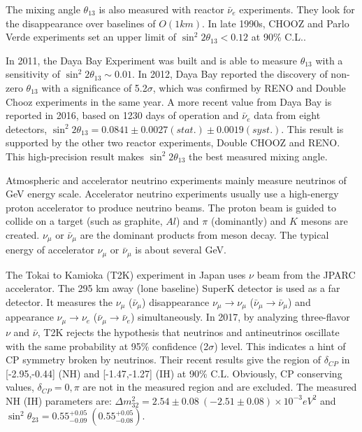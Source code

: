 \documentclass[preprint,12pt]{elsarticle}
\numberwithin{equation}{section}
\begin{document}
The mixing angle $\theta_{13}$ is also measured with reactor $\bar{\nu}_e$ experiments. They look for the disappearance over baselines of $O(1 km)$. In late 1990s, CHOOZ and Parlo Verde experiments set an upper limit of $\sin^2 2\theta_{13}<0.12$ at 90\% C.L.\cite{joseTextbook}.

In 2011, the Daya Bay Experiment was built and is able to measure $\theta_{13}$ with a sensitivity of $\sin^2 2\theta_{13}\sim 0.01$.
In 2012, Daya Bay reported the discovery of non-zero $\theta_{13}$ with a significance of 5.2$\sigma$, which was confirmed by RENO and Double Chooz experiments in the same year. A more recent value from Daya Bay is reported in 2016\cite{dayabayresults}, based on 1230 days of operation and $\bar{\nu}_e$ data from eight detectors, $\sin^2 2\theta_{13} = 0.0841\pm0.0027(stat.)\pm0.0019(syst.)$. This result is supported by the other two reactor experiments, Double CHOOZ and RENO. This high-precision result makes $\sin^2 2\theta_{13}$ the best measured mixing angle\cite{reactorNu}.

Atmospheric and accelerator neutrino experiments mainly measure neutrinos of GeV energy scale. Accelerator neutrino experiments usually use a high-energy proton accelerator to produce neutrino beams. The proton beam is guided to collide on a target (such as graphite, $Al$) and $\pi$ (dominantly) and $K$ mesons are created. $\nu_\mu$ or $\bar{\nu}_\mu$ are the dominant products from meson decay. The typical energy of accelerator $\nu_\mu$ or $\bar{\nu}_\mu$ is about several GeV.

The Tokai to Kamioka (T2K) experiment in Japan uses $\nu$ beam from the JPARC accelerator. The 295 km away (lone baseline) SuperK detector is used as a far detector. It measures the $\nu_\mu$ ($\bar\nu_\mu$) disappearance $\nu_\mu\to\nu_\mu$ ($\bar{\nu}_\mu\to\bar{\nu}_\mu$) and appearance $\nu_\mu\to\nu_e$ ($\bar{\nu}_\mu\to\bar{\nu}_e$) simultaneously. In 2017, by analyzing three-flavor $\nu$ and $\bar{\nu}$, T2K rejects the hypothesis that neutrinos and antineutrinos oscillate with the same probability at 95\% confidence (2$\sigma$) level. This indicates a hint of CP symmetry broken by neutrinos. Their recent results give the region of $\delta_{CP}$ in [-2.95,-0.44] (NH) and [-1.47,-1.27] (IH) at 90\% C.L. Obviously, CP conserving values, $\delta_{CP} = 0,\pi$ are not in the measured region and are excluded. The measured NH (IH) parameters are: $\Delta m^2_{32}=2.54\pm 0.08~(-2.51\pm0.08)\times 10^{-3} eV^2$ and $\sin^2\theta_{23} = 0.55^{+0.05}_{-0.09}~(0.55^{+0.05}_{-0.08})$\cite{t2k}.
\end{document}
